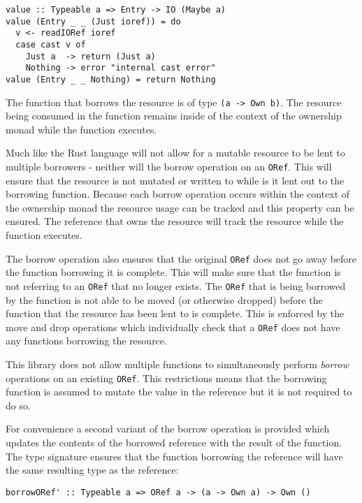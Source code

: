 \documentclass[onehalf,11pt]{beavtex}
\begin{document}
\begin{verbatim}
value :: Typeable a => Entry -> IO (Maybe a)
value (Entry _ _ (Just ioref)) = do
  v <- readIORef ioref
  case cast v of
    Just a  -> return (Just a)
    Nothing -> error "internal cast error"
value (Entry _ _ Nothing) = return Nothing
\end{verbatim}

The function that borrows the resource is of type \texttt{(a -> Own b)}. The
resource being consumed in the function remains inside of the context of the
ownership monad while the function executes. %

Much like the Rust language will not allow for a mutable resource to be lent to
multiple borrowers - neither will the borrow operation on an \texttt{ORef}.
This will ensure that the resource is not mutated or written to while is it lent
out to the borrowing function.
Because each borrow operation occurs within the context of the ownership monad
the resource usage can be tracked and this property can be ensured. The
reference that owns the resource will track the resource while the function
executes.

The borrow operation also ensures that the original \texttt{ORef} does not
go away before the function borrowing it is complete. This will make sure that
the function is not referring to an \texttt{ORef} that no longer exists.
The \texttt{ORef} that is being borrowed by the function is not able to be moved
(or otherwise dropped) before the function that the resource has been lent to is
complete. This is enforced by the move and drop operations which individually
check that a \texttt{ORef} does not have any functions borrowing the resource.

This library does not allow multiple functions to simultaneously perform
\textit{borrow} operations on an existing \texttt{ORef}.
This restrictions means that the borrowing function is assumed to mutate the
value in the reference but it is not required to do so.

For convenience a second variant of the borrow operation is provided which
updates the contents of the borrowed reference with the result of the function. 
The type signature ensures that the function borrowing the reference will
have the same resulting type as the reference:

\begin{verbatim}
borrowORef' :: Typeable a => ORef a -> (a -> Own a) -> Own ()
\end{verbatim}
\end{document}
